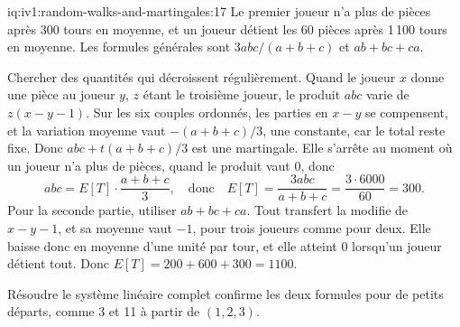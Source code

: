\begin{solution}{iq:iv1:random-walks-and-martingales:17}
Le premier joueur n'a plus de pièces après 300 tours en moyenne, et un joueur détient les 60 pièces après 1\,100 tours en moyenne. Les formules générales sont $3abc/(a + b + c)$ et $ab + bc + ca$.

Chercher des quantités qui décroissent régulièrement. Quand le joueur $x$ donne une pièce au joueur $y$, $z$ étant le troisième joueur, le produit $abc$ varie de $z(x - y - 1)$. Sur les six couples ordonnés, les parties en $x - y$ se compensent, et la variation moyenne vaut $-(a + b + c)/3$, une constante, car le total reste fixe. Donc $abc + t(a + b + c)/3$ est une martingale. Elle s'arrête au moment où un joueur n'a plus de pièces, quand le produit vaut 0, donc
\[
abc = E[T] \cdot \frac{a + b + c}{3}, \quad\text{donc}\quad E[T] = \frac{3abc}{a + b + c} = \frac{3 \cdot 6000}{60} = 300.
\]
Pour la seconde partie, utiliser $ab + bc + ca$. Tout transfert la modifie de $x - y - 1$, et sa moyenne vaut $-1$, pour trois joueurs comme pour deux. Elle baisse donc en moyenne d'une unité par tour, et elle atteint 0 lorsqu'un joueur détient tout. Donc $E[T] = 200 + 600 + 300 = 1100$.

Résoudre le système linéaire complet confirme les deux formules pour de petits départs, comme 3 et 11 à partir de $(1, 2, 3)$.

\end{solution}

